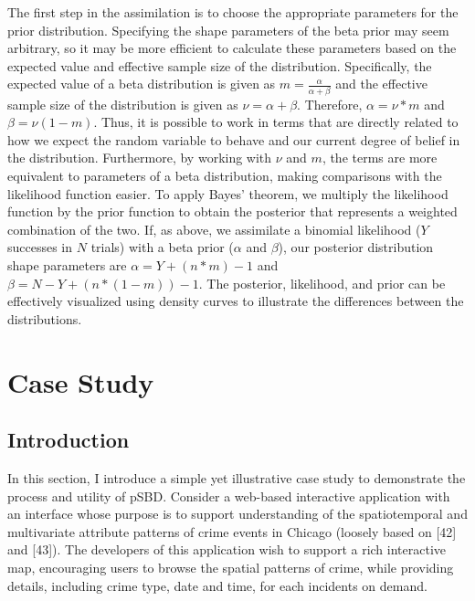 \documentclass[]{article}
\begin{document}
The first step in the assimilation is to choose the appropriate
parameters for the prior distribution. Specifying the shape parameters
of the beta prior may seem arbitrary, so it may be more efficient to
calculate these parameters based on the expected value and effective
sample size of the distribution. Specifically, the expected value of a
beta distribution is given as \(m = \frac{\alpha}{\alpha + \beta}\) and
the effective sample size of the distribution is given as
\(\nu = \alpha + \beta\). Therefore, \(\alpha = \nu * m\) and
\(\beta = \nu(1 - m)\). Thus, it is possible to work in terms that are
directly related to how we expect the random variable to behave and our
current degree of belief in the distribution. Furthermore, by working
with \(\nu\) and \(m\), the terms are more equivalent to parameters of a
beta distribution, making comparisons with the likelihood function
easier. To apply Bayes' theorem, we multiply the likelihood function by
the prior function to obtain the posterior that represents a weighted
combination of the two. If, as above, we assimilate a binomial
likelihood (\(Y\) successes in \(N\) trials) with a beta prior
(\(\alpha\) and \(\beta\)), our posterior distribution shape parameters
are \(\alpha = Y + (n*m) - 1\) and \(\beta= N - Y + (n*(1-m)) - 1\). The
posterior, likelihood, and prior can be effectively visualized using
density curves to illustrate the differences between the
distributions.\textbar{}

\section{Case Study}\label{case-study}

\subsection{Introduction}\label{introduction-1}

In this section, I introduce a simple yet illustrative case study to
demonstrate the process and utility of pSBD. Consider a web-based
interactive application with an interface whose purpose is to support
understanding of the spatiotemporal and multivariate attribute patterns
of crime events in Chicago (loosely based on {[}42{]} and {[}43{]}). The
developers of this application wish to support a rich interactive map,
encouraging users to browse the spatial patterns of crime, while
providing details, including crime type, date and time, for each
incidents on demand.
\end{document}

